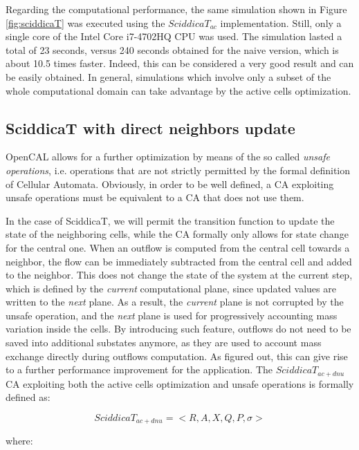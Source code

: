 Regarding the computational performance, the same simulation shown in
Figure \ref{fig:sciddicaT} was executed using the $SciddicaT_{ac}$
implementation. Still, only a single core of the Intel Core i7-4702HQ
CPU was used. The simulation lasted a total of 23 seconds, versus 240
seconds obtained for the naive version, which is about 10.5 times
faster. Indeed, this can be considered a very good result and can be
easily obtained. In general, simulations which involve only a subset
of the whole computational domain can take advantage by the active
cells optimization.

\subsection{SciddicaT with direct neighbors update}\label{sec:sciddicaT_extended}
OpenCAL allows for a further optimization by means of the so called
\emph{unsafe operations}, i.e. operations that are not strictly
permitted by the formal definition of Cellular Automata. Obviously, in
order to be well defined, a CA exploiting unsafe operations must be
equivalent to a CA that does not use them.

In the case of SciddicaT, we will permit the transition function to
update the state of the neighboring cells, while the CA formally only
allows for state change for the central one. When an outflow is
computed from the central cell towards a neighbor, the flow can be
immediately subtracted from the central cell and added to the
neighbor. This does not change the state of the system at the current
step, which is defined by the \emph{current} computational plane,
since updated values are written to the \emph{next} plane. As a
result, the \emph{current} plane is not corrupted by the unsafe
operation, and the \emph{next} plane is used for progressively
accounting mass variation inside the cells. By introducing such
feature, outflows do not need to be saved into additional substates
anymore, as they are used to account mass exchange directly during
outflows computation. As figured out, this can give rise to a further
performance improvement for the application. The $SciddicaT_{ac+dnu}$
CA exploiting both the active cells optimization and unsafe operations
is formally defined as:


$$SciddicaT_{ac+dnu} = < R, A, X, Q , P, \sigma  >$$

where:


